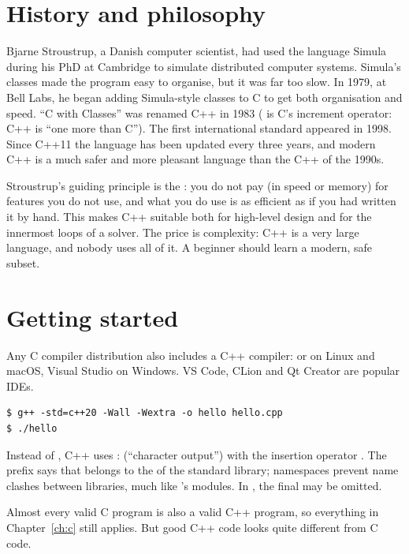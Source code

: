 \section{History and philosophy}

\begin{history}
Bjarne Stroustrup, a Danish computer scientist, had used the language Simula during his
PhD at Cambridge to simulate distributed computer systems. Simula's classes made the
program easy to organise, but it was far too slow. In 1979, at Bell Labs, he began adding
Simula-style classes to C to get both organisation and speed. ``C with Classes'' was
renamed C++ in 1983 (\code{++} is C's increment operator: C++ is ``one more than C''). The
first international standard appeared in 1998. Since C++11 the language has been updated
every three years, and modern C++ is a much safer and more pleasant language than the C++
of the 1990s.
\end{history}

Stroustrup's guiding principle is the : you do not pay
(in speed or memory) for features you do not use, and what you do use is as efficient as
if you had written it by hand. This makes C++ suitable both for high-level design and for
the innermost loops of a solver. The price is complexity: C++ is a very large language, and
nobody uses all of it. A beginner should learn a modern, safe subset.

\section{Getting started}

Any C compiler distribution also includes a C++ compiler:  or  on
Linux and macOS, Visual Studio on Windows. VS Code, CLion and Qt Creator are popular IDEs.
\begin{lstlisting}[style=shell]
$ g++ -std=c++20 -Wall -Wextra -o hello hello.cpp
$ ./hello
\end{lstlisting}
Instead of , C++ uses :  (``character
output'') with the insertion operator \code{<<}. The prefix  says that
 belongs to the  of the standard library; namespaces prevent
name clashes between libraries, much like \py's modules. In , the final
 may be omitted.

Almost every valid C program is also a valid C++ program, so everything in
Chapter~\ref{ch:c} still applies. But good C++ code looks quite different from C code.

